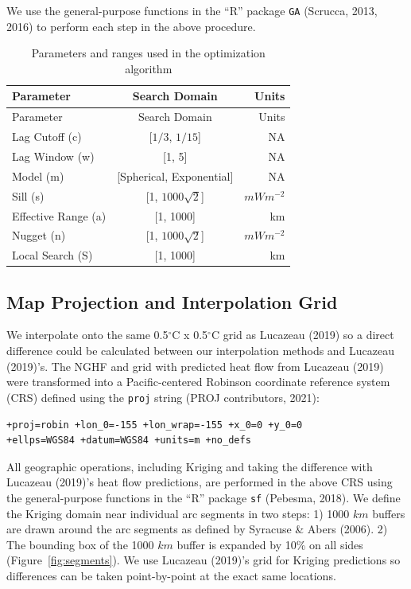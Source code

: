 \documentclass[draft,linenumbers]{agujournal2018}
\begin{document}
We use the general-purpose functions in the ``R'' package \texttt{GA}
(Scrucca, 2013, 2016) to perform each step in the above procedure.

\hypertarget{tbl:search}{}
\begin{longtable}[]{@{}lcr@{}}
\caption{\label{tbl:search}Parameters and ranges used in the
optimization algorithm}\tabularnewline
\toprule
Parameter & Search Domain & Units \\
\midrule
\endfirsthead
\toprule
Parameter & Search Domain & Units \\
\midrule
\endhead
Lag Cutoff (c) & {[}\(1/3\), \(1/15\){]} & NA \\
Lag Window (w) & {[}1, 5{]} & NA \\
Model (m) & {[}Spherical, Exponential{]} & NA \\
Sill (s) & {[}1, \(1000\sqrt{2}\){]} & \(mWm^{-2}\) \\
Effective Range (a) & {[}1, 1000{]} & km \\
Nugget (n) & {[}1, \(1000\sqrt{2}\){]} & \(mWm^{-2}\) \\
Local Search (S) & {[}1, 1000{]} & km \\
\bottomrule
\end{longtable}

\subsection{Map Projection and Interpolation Grid}

We interpolate onto the same 0.5\(^{\circ}\)C x 0.5\(^{\circ}\)C grid as
Lucazeau (2019) so a direct difference could be calculated between our
interpolation methods and Lucazeau (2019)'s. The NGHF and grid with
predicted heat flow from Lucazeau (2019) were transformed into a
Pacific-centered Robinson coordinate reference system (CRS) defined
using the \texttt{proj} string (PROJ contributors, 2021):

\begin{verbatim}
+proj=robin +lon_0=-155 +lon_wrap=-155 +x_0=0 +y_0=0
+ellps=WGS84 +datum=WGS84 +units=m +no_defs
\end{verbatim}

All geographic operations, including Kriging and taking the difference
with Lucazeau (2019)'s heat flow predictions, are performed in the above
CRS using the general-purpose functions in the ``R'' package \texttt{sf}
(Pebesma, 2018). We define the Kriging domain near individual arc
segments in two steps: 1) 1000 \(km\) buffers are drawn around the arc
segments as defined by Syracuse \& Abers (2006). 2) The bounding box of
the 1000 \(km\) buffer is expanded by 10\% on all sides
(Figure~\ref{fig:segments}). We use Lucazeau (2019)'s grid for Kriging
predictions so differences can be taken point-by-point at the exact same
locations.
\end{document}

